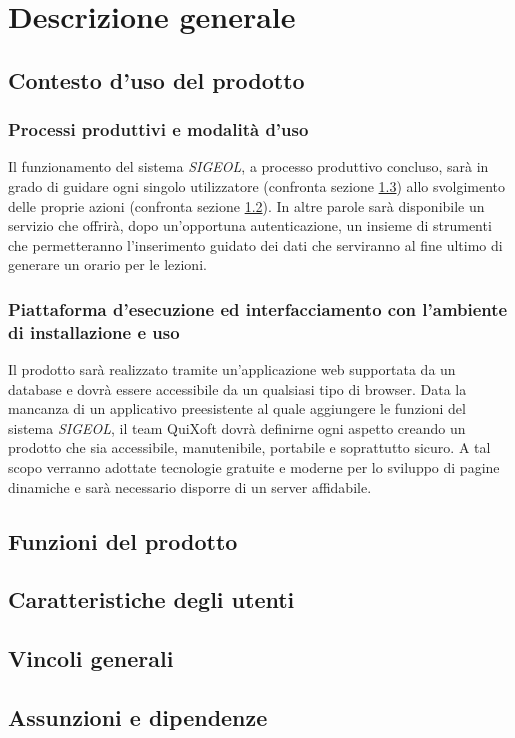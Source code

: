\documentclass[11pt,a4paper]{article}
\begin{document}
\section{Descrizione generale}
\subsection{Contesto d'uso del prodotto}
\subsubsection{Processi produttivi e modalità d'uso}
Il funzionamento del sistema \textit{SIGEOL}, a processo produttivo concluso, sarà in grado di guidare ogni singolo utilizzatore (confronta sezione \ref{utenti}) allo svolgimento delle proprie azioni (confronta sezione \ref{funzioni}). In altre parole sarà disponibile un servizio che offrirà, dopo un'opportuna autenticazione, un insieme di strumenti che permetteranno l'inserimento guidato dei dati che serviranno al fine ultimo di generare un orario per le lezioni.
\subsubsection{Piattaforma d’esecuzione ed interfacciamento con l’ambiente di installazione e uso}
Il prodotto sarà realizzato tramite un'applicazione web supportata da un database e dovrà essere accessibile da un qualsiasi tipo di browser. Data la mancanza di un applicativo preesistente al quale aggiungere le funzioni del sistema \textit{SIGEOL}, il team QuiXoft dovrà definirne ogni aspetto creando un prodotto che sia accessibile, manutenibile, portabile e soprattutto sicuro. A tal scopo verranno adottate tecnologie gratuite e moderne per lo sviluppo di pagine dinamiche e sarà necessario disporre di un server affidabile.
\subsection{Funzioni del prodotto} \label{funzioni}

\subsection{Caratteristiche degli utenti} \label{utenti} 
\subsection{Vincoli generali}
\subsection{Assunzioni e dipendenze}
\end{document}
